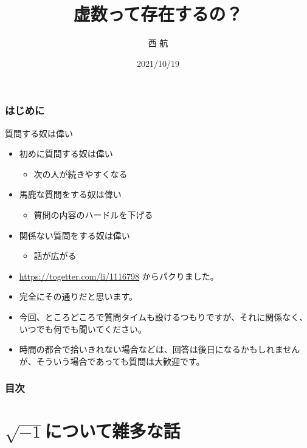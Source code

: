 \documentclass[dvipdfmx]{beamer}
\title{虚数って存在するの？}
\author{西 航}
\date{2021/10/19}
\begin{document}
  \maketitle

  \begin{frame}
    \frametitle{はじめに}

    \begin{alertblock}{質問する奴は偉い}
      \begin{itemize}
        \item 初めに質問する奴は偉い
        \begin{itemize}
          \item 次の人が続きやすくなる
        \end{itemize}
        \item 馬鹿な質問をする奴は偉い
        \begin{itemize}
          \item 質問の内容のハードルを下げる
        \end{itemize}
        \item 関係ない質問をする奴は偉い
        \begin{itemize}
          \item 話が広がる
        \end{itemize}
      \end{itemize}
    \end{alertblock}

    \begin{itemize}
      \item \url{https://togetter.com/li/1116798} からパクりました。
      \item 完全にその通りだと思います。
      \item 今回、ところどころで質問タイムも設けるつもりですが、それに関係なく、いつでも何でも聞いてください。
      \item 時間の都合で拾いきれない場合などは、回答は後日になるかもしれませんが、そういう場合であっても質問は大歓迎です。
    \end{itemize}

  \end{frame}

  \begin{frame}
    \frametitle{目次}

    \tableofcontents

  \end{frame}

  \section{$\sqrt{-1}$について雑多な話}
\end{document}
